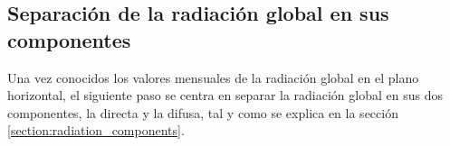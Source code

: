 \subsection{Separación de la radiación global en sus componentes}

Una vez conocidos los valores mensuales de la radiación global en el plano horizontal, el siguiente paso se centra en separar la radiación global en sus dos componentes, la directa y la difusa, tal y como se explica en la sección \ref{section:radiation_components}.